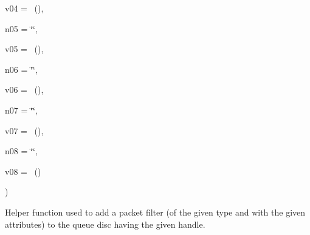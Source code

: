 {\begin{DoxyParamCaption}
\item[{const {\bf Attribute\+Value} \&}]{v04 = {~()}, }
\item[{std\+::string}]{n05 = {\ttfamily \char`\"{}\char`\"{}}, }
\item[{const {\bf Attribute\+Value} \&}]{v05 = {~()}, }
\item[{std\+::string}]{n06 = {\ttfamily \char`\"{}\char`\"{}}, }
\item[{const {\bf Attribute\+Value} \&}]{v06 = {~()}, }
\item[{std\+::string}]{n07 = {\ttfamily \char`\"{}\char`\"{}}, }
\item[{const {\bf Attribute\+Value} \&}]{v07 = {~()}, }
\item[{std\+::string}]{n08 = {\ttfamily \char`\"{}\char`\"{}}, }
\item[{const {\bf Attribute\+Value} \&}]{v08 = {~()}}
\end{DoxyParamCaption}
)}\hypertarget{classns3_1_1TrafficControlHelper_aa9bde683bb9913c5e273dffde8306c08}{}\label{classns3_1_1TrafficControlHelper_aa9bde683bb9913c5e273dffde8306c08}
Helper function used to add a packet filter (of the given type and with the given attributes) to the queue disc having the given handle.


